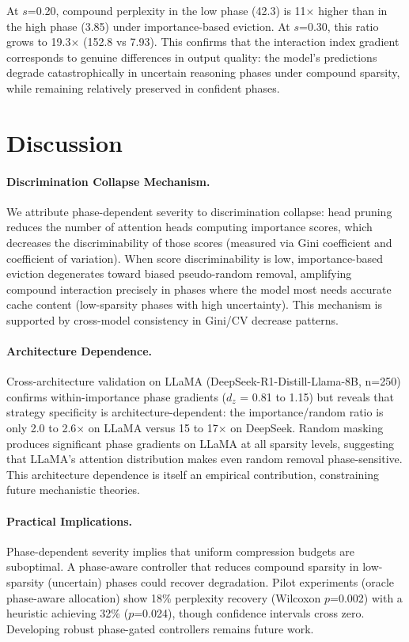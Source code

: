 \documentclass[11pt,a4paper]{article}
\begin{document}
At $s$=0.20, compound perplexity in the low phase (42.3) is 11$\times$ higher than in the high phase (3.85) under importance-based eviction. At $s$=0.30, this ratio grows to 19.3$\times$ (152.8 vs 7.93). This confirms that the interaction index gradient corresponds to genuine differences in output quality: the model's predictions degrade catastrophically in uncertain reasoning phases under compound sparsity, while remaining relatively preserved in confident phases.

\section{Discussion}

\paragraph{Discrimination Collapse Mechanism.}
We attribute phase-dependent severity to discrimination collapse: head pruning reduces the number of attention heads computing importance scores, which decreases the discriminability of those scores (measured via Gini coefficient and coefficient of variation). When score discriminability is low, importance-based eviction degenerates toward biased pseudo-random removal, amplifying compound interaction precisely in phases where the model most needs accurate cache content (low-sparsity phases with high uncertainty). This mechanism is supported by cross-model consistency in Gini/CV decrease patterns.

\paragraph{Architecture Dependence.}
Cross-architecture validation on LLaMA (DeepSeek-R1-Distill-Llama-8B, n=250) confirms within-importance phase gradients ($d_z$ = 0.81 to 1.15) but reveals that strategy specificity is architecture-dependent: the importance/random ratio is only 2.0 to 2.6$\times$ on LLaMA versus 15 to 17$\times$ on DeepSeek. Random masking produces significant phase gradients on LLaMA at all sparsity levels, suggesting that LLaMA's attention distribution makes even random removal phase-sensitive. This architecture dependence is itself an empirical contribution, constraining future mechanistic theories.

\paragraph{Practical Implications.}
Phase-dependent severity implies that uniform compression budgets are suboptimal. A phase-aware controller that reduces compound sparsity in low-sparsity (uncertain) phases could recover degradation. Pilot experiments (oracle phase-aware allocation) show 18\% perplexity recovery (Wilcoxon $p$=0.002) with a heuristic achieving 32\% ($p$=0.024), though confidence intervals cross zero. Developing robust phase-gated controllers remains future work.
\end{document}
